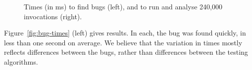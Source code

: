 \begin{figure}
\begin{minipage}{0.51\textwidth}
\begin{tabular}{lr@{$\null\pm\null$}l@{}}
\end{tabular}
\end{minipage}
\caption{Times (in ms) to find bugs (left), and to run and analyse 240,000
  invocations (right). \label{fig:bug-times}\label{fig:throughput}}
\end{figure}



Figure~\ref{fig:bug-times} (left) gives results.  In each, the bug was found
quickly, in less than one second on average.  We believe that the variation in
times mostly reflects differences between the bugs, rather than differences
between the testing algorithms.

